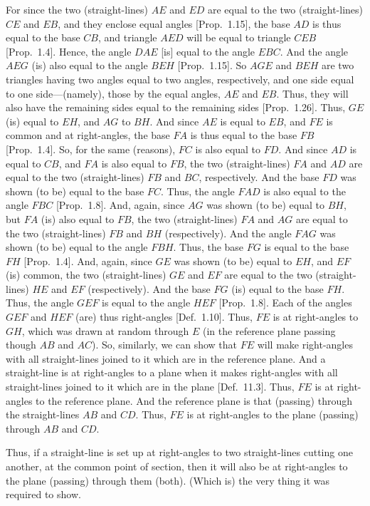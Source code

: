 For since the two (straight-lines) $AE$ and $ED$ are equal to the two (straight-lines) $CE$ and $EB$, and they  enclose equal angles [Prop.~1.15], the base $AD$ is thus equal to the
base $CB$, and triangle $AED$ will be equal to triangle $CEB$ [Prop.~1.4]. Hence, the angle $DAE$ [is] equal to
the angle $EBC$. And the angle $AEG$ (is)  also equal to the angle
$BEH$ [Prop.~1.15]. So $AGE$ and $BEH$
are two triangles having two angles equal to two angles, respectively, and
one side equal to one side---(namely), those by the equal angles, $AE$ and $EB$. Thus, they will also have the remaining sides equal to the remaining
sides [Prop.~1.26]. Thus, $GE$ (is) equal to $EH$, 
and $AG$ to $BH$. And since $AE$ is equal to $EB$, and $FE$ is
common and at right-angles, the base $FA$ is thus equal to the base $FB$ [Prop.~1.4]. So, for the same (reasons), $FC$ is also
equal to $FD$. And since $AD$ is equal to $CB$, and $FA$ is also equal to
$FB$, the two (straight-lines) $FA$ and $AD$ are equal to the
two (straight-lines) $FB$ and $BC$, respectively. And the base $FD$
was shown (to be) equal to the base $FC$. Thus, the angle $FAD$ is also
equal to the angle $FBC$ [Prop.~1.8]. And, again,
since $AG$ was shown (to be) equal to $BH$, but $FA$ (is) also equal to
$FB$, the two (straight-lines) $FA$ and $AG$ are equal to the
two (straight-lines) $FB$ and $BH$ (respectively). And the angle $FAG$
was shown (to be) equal to the angle $FBH$. Thus, the base $FG$ is equal
to the base $FH$ [Prop.~1.4]. And, again, since
$GE$ was shown (to be) equal to $EH$, and $EF$ (is) common, the two
(straight-lines) $GE$ and $EF$ are equal to the two (straight-lines)
$HE$ and $EF$ (respectively). And the base $FG$
(is) equal to the base $FH$. Thus, the angle $GEF$ is equal to the
angle $HEF$ [Prop.~1.8]. Each of the
angles $GEF$ and $HEF$ (are) thus right-angles [Def.~1.10]. Thus, $FE$ is
at right-angles to $GH$, which was drawn at random through $E$ (in the reference plane passing though $AB$ and $AC$). So, similarly, we can show that
$FE$ will make right-angles with all straight-lines joined to it which are in the reference plane. And a straight-line is at right-angles
to a plane when it makes right-angles with all straight-lines joined to
it which are in the plane [Def.~11.3]. Thus,
$FE$ is at right-angles to the reference plane. And the reference plane
is that (passing) through the straight-lines $AB$ and $CD$. Thus,
$FE$ is at right-angles to the plane (passing) through $AB$ and
$CD$.

Thus, if a straight-line is set up at right-angles to two straight-lines cutting one another, at the common point of section, then it will also be
at right-angles to the plane (passing) through them (both). (Which is)
the very thing it was required to show.

